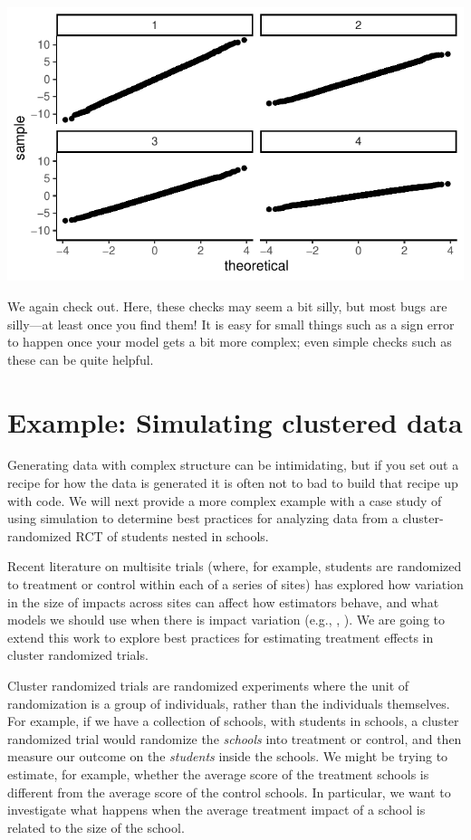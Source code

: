 \documentclass[
]{book}
\begin{document}
\begin{center}\includegraphics[width=0.75\linewidth]{Designing-Simulations-in-R_files/figure-latex/unnamed-chunk-70-1} \end{center}

We again check out.
Here, these checks may seem a bit silly, but most bugs are silly---at least once you find them!
It is easy for small things such as a sign error to happen once your model gets a bit more complex; even simple checks such as these can be quite helpful.

\section{Example: Simulating clustered data}\label{case-cluster}

Generating data with complex structure can be intimidating, but if you set out a recipe for how the data is generated it is often not to bad to build that recipe up with code.
We will next provide a more complex example with a case study of using simulation to determine best practices for analyzing data from a cluster-randomized RCT of students nested in schools.

Recent literature on multisite trials (where, for example, students are randomized to treatment or control within each of a series of sites) has explored how variation in the size of impacts across sites can affect how estimators behave, and what models we should use when there is impact variation (e.g., \citet{miratrix2021applied}, \citet{Bloom:2016um}).
We are going to extend this work to explore best practices for estimating treatment effects in cluster randomized trials.

Cluster randomized trials are randomized experiments where the unit of randomization is a group of individuals, rather than the individuals themselves.
For example, if we have a collection of schools, with students in schools, a cluster randomized trial would randomize the \emph{schools} into treatment or control, and then measure our outcome on the \emph{students} inside the schools.
We might be trying to estimate, for example, whether the average score of the treatment schools is different from the average score of the control schools.
In particular, we want to investigate what happens when the average treatment impact of a school is related to the size of the school.
\end{document}
